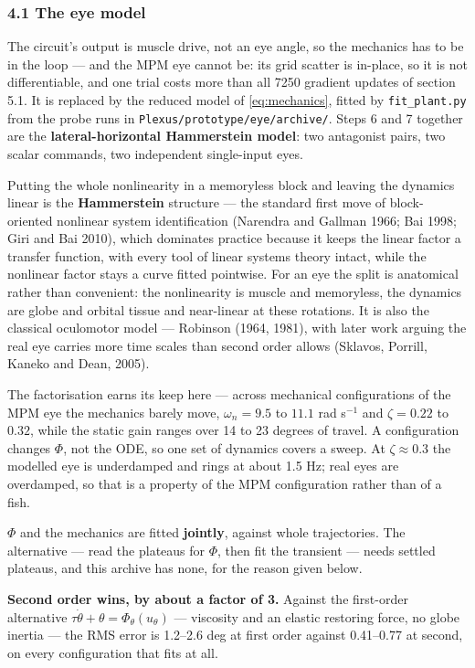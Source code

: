 \documentclass[10pt]{article}
\begin{document}
\subsubsection*{4.1 The eye model}

The circuit's output is muscle drive, not an eye angle, so the mechanics has to be in the
loop --- and the MPM eye cannot be: its grid scatter is in-place, so it is not
differentiable, and one trial costs more than all 7250 gradient updates of section 5.1. It
is replaced by the reduced model of \eqref{eq:mechanics}, fitted by \texttt{fit\_plant.py}
from the probe runs in \texttt{Plexus/prototype/eye/archive/}. Steps 6 and 7 together are
the \textbf{lateral-horizontal Hammerstein model}: two antagonist pairs, two scalar
commands, two independent single-input eyes.

Putting the whole nonlinearity in a memoryless block and leaving the dynamics linear is the
\textbf{Hammerstein} structure --- the standard first move of block-oriented nonlinear
system identification (Narendra and Gallman 1966; Bai 1998; Giri and Bai 2010), which
dominates practice because it keeps the linear factor a transfer function, with every tool
of linear systems theory intact, while the nonlinear factor stays a curve fitted pointwise.
For an eye the split is anatomical rather than convenient: the nonlinearity is muscle and
memoryless, the dynamics are globe and orbital tissue and near-linear at these rotations. It
is also the classical oculomotor model --- Robinson (1964, 1981), with later work arguing
the real eye carries more time scales than second order allows (Sklavos, Porrill, Kaneko and
Dean, 2005).

The factorisation earns its keep here --- across mechanical configurations of the MPM eye
the mechanics barely move, $\omega_n = 9.5$ to $11.1$ rad s$^{-1}$ and $\zeta = 0.22$ to
$0.32$, while the static gain ranges over 14 to 23 degrees of travel. A configuration
changes $\Phi$, not the ODE, so one set of dynamics covers a sweep. At $\zeta \approx 0.3$
the modelled eye is underdamped and rings at about 1.5 Hz; real eyes are overdamped, so that
is a property of the MPM configuration rather than of a fish.

$\Phi$ and the mechanics are fitted \textbf{jointly}, against whole trajectories. The
alternative --- read the plateaus for $\Phi$, then fit the transient --- needs settled
plateaus, and this archive has none, for the reason given below.

\textbf{Second order wins, by about a factor of 3.} Against the first-order alternative
$\tau\dot\theta + \theta = \Phi_\theta(u_\theta)$ --- viscosity and an elastic restoring
force, no globe inertia --- the RMS error is 1.2--2.6 deg at first order against 0.41--0.77
at second, on every configuration that fits at all.
\end{document}
